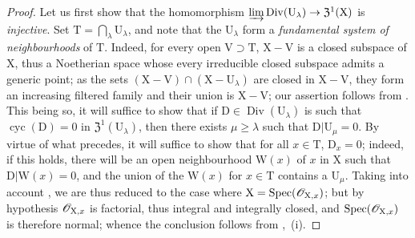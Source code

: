 \begin{proof}
Let us first show that the homomorphism $\varinjlim\operatorname{Div}(\mathrm{U}_\lambda)\to\mathfrak{Z}^1(\mathrm{X})$ is \emph{injective}.
Set $\mathrm{T}=\bigcap_\lambda\mathrm{U}_\lambda$, and note that the $\mathrm{U}_\lambda$ form a \emph{fundamental system of neighbourhoods} of $\mathrm{T}$.
Indeed, for every open $\mathrm{V}\supset\mathrm{T}$, $\mathrm{X}-\mathrm{V}$ is a closed subspace of $\mathrm{X}$, thus a Noetherian space whose every irreducible closed subspace admits a generic point;
as the sets $(\mathrm{X}-\mathrm{V})\cap(\mathrm{X}-\mathrm{U}_\lambda)$ are closed in $\mathrm{X}-\mathrm{V}$, they form an increasing filtered family and their union is $\mathrm{X}-\mathrm{V}$;
our assertion follows from .
This being so, it will suffice to show that if $\mathrm{D}\in\operatorname{Div}(\mathrm{U}_\lambda)$ is such that $\operatorname{cyc}(\mathrm{D})=0$ in $\mathfrak{Z}^1(\mathrm{U}_\lambda)$, then there exists $\mu\geq\lambda$ such that $\mathrm{D}|\mathrm{U}_\mu=0$.
By virtue of what precedes, it will suffice to show that for all $x\in\mathrm{T}$, $\mathrm{D}_x=0$;
indeed, if this holds, there will be an open neighbourhood $\mathrm{W}(x)$ of $x$ in $\mathrm{X}$ such that $\mathrm{D}|\mathrm{W}(x)=0$, and the union of the $\mathrm{W}(x)$ for $x\in\mathrm{T}$ contains a $\mathrm{U}_\mu$.
Taking into account , we are thus reduced to the case where $\mathrm{X}=\operatorname{Spec}(\mathscr{O}_{\mathrm{X},x})$;
but by hypothesis $\mathscr{O}_{\mathrm{X},x}$ is factorial, thus integral and integrally closed, and $\operatorname{Spec}(\mathscr{O}_{\mathrm{X},x})$ is therefore normal;
whence the conclusion follows from ,{}~(i).


\end{proof}
